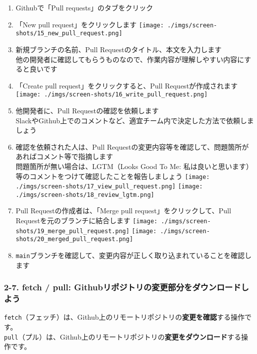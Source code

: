 \begin{enumerate}
\def\labelenumi{\arabic{enumi}.}
\item
  Githubで「Pull requests」のタブをクリック
\item
  「New pull request」をクリックします
  \texttt{[image: ./imgs/screen-shots/15\_new\_pull\_request.png]}
\item
  新規ブランチの名前、Pull Requestのタイトル、本文を入力します\\
  他の開発者に確認してもらうものなので、作業内容が理解しやすい内容にすると良いです
\item
  「Create pull request」をクリックすると、Pull Requestが作成されます
  \texttt{[image: ./imgs/screen-shots/16\_write\_pull\_request.png]}
\item
  他開発者に、Pull Requestの確認を依頼します\\
  SlackやGithub上でのコメントなど、適宜チーム内で決定した方法で依頼しましょう
\item
  確認を依頼された人は、Pull
  Requestの変更内容等を確認して、問題箇所があればコメント等で指摘します\\
  問題箇所が無い場合は、LGTM（Looks Good To Me:
  私は良いと思います）等のコメントをつけて確認したことを報告しましょう
  \texttt{[image: ./imgs/screen-shots/17\_view\_pull\_request.png]}
  \texttt{[image: ./imgs/screen-shots/18\_review\_lgtm.png]}
\item
  Pull Requestの作成者は、「Merge pull request」をクリックして、Pull
  Requestを元のブランチに結合します
  \texttt{[image: ./imgs/screen-shots/19\_merge\_pull\_request.png]}
  \texttt{[image: ./imgs/screen-shots/20\_merged\_pull\_request.png]}
\item
  \texttt{main}ブランチを確認して、変更内容が正しく取り込まれていることを確認します
\end{enumerate}

\subsubsection{2-7. fetch / pull:
Githubリポジトリの変更部分をダウンロードしよう}\label{fetch-pull-githubux30eaux30ddux30b8ux30c8ux30eaux306eux5909ux66f4ux90e8ux5206ux3092ux30c0ux30a6ux30f3ux30edux30fcux30c9ux3057ux3088ux3046}

\texttt{fetch}（フェッチ）は、Github上のリモートリポジトリの\textbf{変更を確認}する操作です。\\
\texttt{pull}（プル）は、Github上のリモートリポジトリの\textbf{変更をダウンロード}する操作です。

